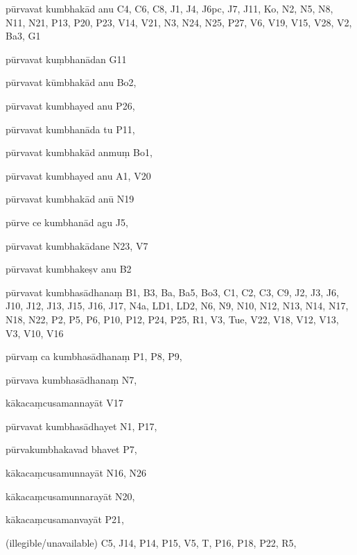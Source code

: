 \begin{ekdosis}
\begin{marma}[hp01_055]
\begin{marma}[hp02_009]
\begin{marma}[hp02_011]
 \begin{marma}[hp02_58b]
\item[pūrvavat kumbhakād anu] C4, C6, C8, J1, J4, J6pc, J7, J11, Ko, N2, N5, N8, N11, N21, P13, P20, P23, V14, V21, N3, N24, N25, P27, V6, V19, V15, V28, V2, Ba3, G1
\item[pūrvavat kuṃbhanādan] G11
\item[pūrvavat kūmbhakād anu] Bo2,
\item[pūrvavat kumbhayed anu] P26,
\item[pūrvavat kumbhanāda tu] P11,
\item[pūrvavat kumbhakād anmuṃ] Bo1,
\item[pūrvavat kumbhayed anu] A1, V20
\item[pūrvavat kumbhakād anū] N19
\item[pūrve ce kumbhanād agu] J5,
\item[pūrvavat kumbhakādane] N23, V7
\item[pūrvavat kumbhakeṣv anu] B2
\item[pūrvavat kumbhasādhanaṃ] B1, B3, Ba, Ba5, Bo3, C1, C2, C3, C9, J2, J3, J6, J10, J12, J13, J15, J16, J17, N4a, LD1, LD2, N6, N9, N10, N12, N13, N14, N17, N18, N22, P2, P5, P6, P10, P12, P24, P25, R1, V3, Tue, V22, V18, V12, V13, V3, V10, V16
\item[pūrvaṃ ca  kumbhasādhanaṃ] P1, P8, P9, 
\item[pūrvava kumbhasādhanaṃ] N7, 
\item[kākacaṃcusamannayāt] V17
\item[pūrvavat kumbhasādhayet] N1, P17, 
\item[pūrvakumbhakavad bhavet] P7,
\item[kākacaṃcusamunnayāt] N16, N26
\item[kākacaṃcusamunnarayāt] N20, 
\item[kākacaṃcusamanvayāt] P21, 
\item[(illegible/unavailable)] C5, J14, P14, P15, V5, T, P16, P18, P22, R5,
  \begin{description}

    \end{description}
 \end{marma}


\end{marma}
\end{marma}
\end{marma}
\end{ekdosis}

